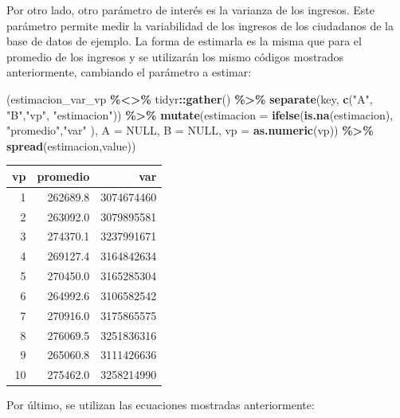 \documentclass[
  12pt,
]{book}
\newenvironment{Shaded}{\begin{snugshade}}{\end{snugshade}}
\newcommand{\AttributeTok}[1]{\textcolor[rgb]{0.13,0.29,0.53}{#1}}
\newcommand{\ConstantTok}[1]{\textcolor[rgb]{0.56,0.35,0.01}{#1}}
\newcommand{\FunctionTok}[1]{\textcolor[rgb]{0.13,0.29,0.53}{\textbf{#1}}}
\newcommand{\NormalTok}[1]{#1}
\newcommand{\SpecialCharTok}[1]{\textcolor[rgb]{0.81,0.36,0.00}{\textbf{#1}}}
\newcommand{\StringTok}[1]{\textcolor[rgb]{0.31,0.60,0.02}{#1}}
\begin{document}
Por otro lado, otro parámetro de interés es la varianza de los ingresos. Este parámetro permite medir la variabilidad de los ingresos de los ciudadanos de la base de datos de ejemplo. La forma de estimarla es la misma que para el promedio de los ingresos y se utilizarán los mismo códigos mostrados anteriormente, cambiando el parámetro a estimar:

\begin{Shaded}
\begin{Highlighting}[]
\NormalTok{(estimacion\_var\_vp }\SpecialCharTok{\%\textless{}\textgreater{}\%}\NormalTok{ tidyr}\SpecialCharTok{::}\FunctionTok{gather}\NormalTok{() }\SpecialCharTok{\%\textgreater{}\%}
   \FunctionTok{separate}\NormalTok{(key, }\FunctionTok{c}\NormalTok{(}\StringTok{"A"}\NormalTok{, }\StringTok{"B"}\NormalTok{,}\StringTok{"vp"}\NormalTok{, }\StringTok{"estimacion"}\NormalTok{)) }\SpecialCharTok{\%\textgreater{}\%} 
\FunctionTok{mutate}\NormalTok{(}\AttributeTok{estimacion =} \FunctionTok{ifelse}\NormalTok{(}\FunctionTok{is.na}\NormalTok{(estimacion), }\StringTok{"promedio"}\NormalTok{,}\StringTok{"var"}\NormalTok{ ),}
       \AttributeTok{A =} \ConstantTok{NULL}\NormalTok{, }\AttributeTok{B =} \ConstantTok{NULL}\NormalTok{, }\AttributeTok{vp =} \FunctionTok{as.numeric}\NormalTok{(vp)) }\SpecialCharTok{\%\textgreater{}\%} 
  \FunctionTok{spread}\NormalTok{(estimacion,value))}
\end{Highlighting}
\end{Shaded}

\begin{tabular}{r|r|r}
\hline
vp & promedio & var\\
\hline
1 & 262689.8 & 3074674460\\
\hline
2 & 263092.0 & 3079895581\\
\hline
3 & 274370.1 & 3237991671\\
\hline
4 & 269127.4 & 3164842634\\
\hline
5 & 270450.0 & 3165285304\\
\hline
6 & 264992.6 & 3106582542\\
\hline
7 & 270916.0 & 3175865575\\
\hline
8 & 276069.5 & 3251836316\\
\hline
9 & 265060.8 & 3111426636\\
\hline
10 & 275462.0 & 3258214990\\
\hline
\end{tabular}

Por último, se utilizan las ecuaciones mostradas anteriormente:
\end{document}
